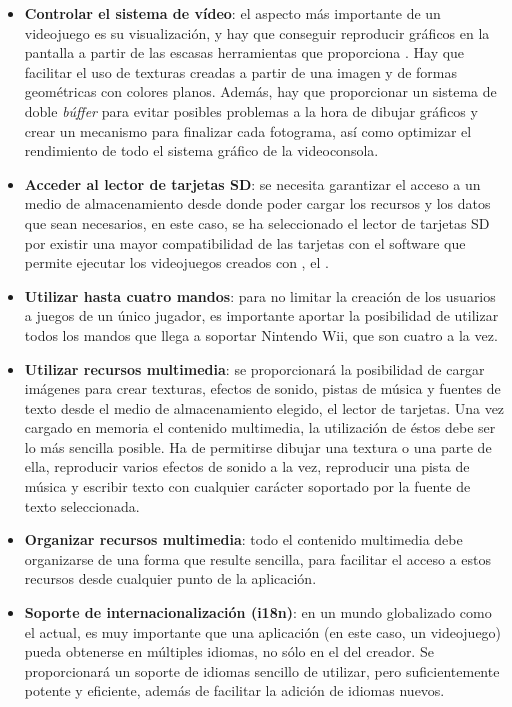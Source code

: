 \begin{itemize}
\item \textbf{Controlar el sistema de vídeo}: el aspecto más importante de un videojuego es su visualización, y hay que conseguir reproducir gráficos en la pantalla a partir de las escasas herramientas que proporciona . Hay que facilitar el uso de texturas creadas a partir de una imagen y de formas geométricas con colores planos. Además, hay que proporcionar un sistema de doble \emph{búffer} para evitar posibles problemas a la hora de dibujar gráficos y crear un mecanismo para finalizar cada fotograma, así como optimizar el rendimiento de todo el sistema gráfico de la videoconsola.
\item \textbf{Acceder al lector de tarjetas SD}: se necesita garantizar el acceso a un medio de almacenamiento desde donde poder cargar los recursos y los datos que sean necesarios, en este caso, se ha seleccionado el lector de tarjetas SD por existir una mayor compatibilidad de las tarjetas con el software que permite ejecutar los videojuegos creados con , el  \cite{website:hbc}.
\item \textbf{Utilizar hasta cuatro mandos}: para no limitar la creación de los usuarios a juegos de un único jugador, es importante aportar la posibilidad de utilizar todos los mandos que llega a soportar Nintendo Wii, que son cuatro a la vez.
\item \textbf{Utilizar recursos multimedia}: se proporcionará la posibilidad de cargar imágenes para crear texturas, efectos de sonido, pistas de música y fuentes de texto desde el medio de almacenamiento elegido, el lector de tarjetas. Una vez cargado en memoria el contenido multimedia, la utilización de éstos debe ser lo más sencilla posible. Ha de permitirse dibujar una textura o una parte de ella, reproducir varios efectos de sonido a la vez, reproducir una pista de música y escribir texto con cualquier carácter soportado por la fuente de texto seleccionada.
\item \textbf{Organizar recursos multimedia}: todo el contenido multimedia debe organizarse de una forma que resulte sencilla, para facilitar el acceso a estos recursos desde cualquier punto de la aplicación.
\item \textbf{Soporte de internacionalización (i18n)}: en un mundo globalizado como el actual, es muy importante que una aplicación (en este caso, un videojuego) pueda obtenerse en múltiples idiomas, no sólo en el del creador. Se proporcionará un soporte de idiomas sencillo de utilizar, pero suficientemente potente y eficiente, además de facilitar la adición de idiomas nuevos.

\end{itemize}
